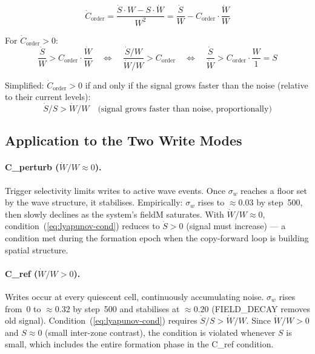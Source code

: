 \documentclass[11pt,a4paper]{article}
\begin{document}
\begin{equation}
\dot{C}_\mathrm{order} = \frac{\dot{S} \cdot W - S \cdot \dot{W}}{W^2}
= \frac{\dot{S}}{W} - C_\mathrm{order} \cdot \frac{\dot{W}}{W}
\end{equation}

For $\dot{C}_\mathrm{order} > 0$:
\begin{equation}
\frac{\dot{S}}{W} > C_\mathrm{order} \cdot \frac{\dot{W}}{W}
\quad \Longleftrightarrow \quad
\frac{\dot{S}/W}{\dot{W}/W} > C_\mathrm{order}
\quad \Longleftrightarrow \quad
\frac{\dot{S}}{\dot{W}} > C_\mathrm{order} \cdot \frac{W}{1} = S
\end{equation}

Simplified: $\dot{C}_\mathrm{order} > 0$ if and only if the signal grows
faster than the noise (relative to their current levels):
\begin{equation}
\boxed{\dot{S}/S > \dot{W}/W \quad\text{(signal grows faster than noise, proportionally)}}
\label{eq:lyapunov-cond}
\end{equation}

\subsection{Application to the Two Write Modes}

\paragraph{C\_perturb ($\dot{W}/W \approx 0$).}
Trigger selectivity limits writes to active wave events.
Once $\sigma_w$ reaches a floor set by the wave structure, it stabilises.
Empirically: $\sigma_w$ rises to $\approx 0.03$ by step~500, then slowly declines
as the system's fieldM saturates.
With $\dot{W}/W \approx 0$, condition~(\ref{eq:lyapunov-cond}) reduces to
$\dot{S} > 0$ (signal must increase) --- a condition met during the
formation epoch when the copy-forward loop is building spatial structure.

\paragraph{C\_ref ($\dot{W}/W > 0$).}
Writes occur at every quiescent cell, continuously accumulating noise.
$\sigma_w$ rises from~0 to $\approx 0.32$ by step~500 and stabilises at
$\approx 0.20$ (FIELD\_DECAY removes old signal).
Condition~(\ref{eq:lyapunov-cond}) requires $\dot{S}/S > \dot{W}/W$.
Since $\dot{W}/W > 0$ and $S \approx 0$ (small inter-zone contrast), the
condition is violated whenever $S$ is small, which includes the entire
formation phase in the C\_ref condition.
\end{document}
